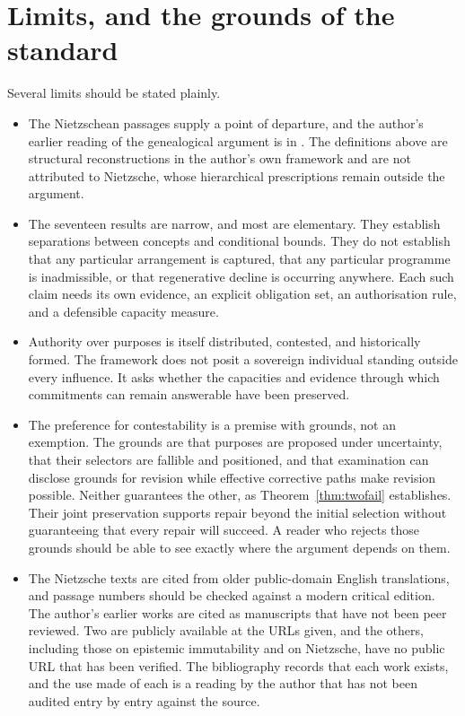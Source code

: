 \documentclass[11pt]{article}
\theoremstyle{definition}
\theoremstyle{remark}
\begin{document}
\section{Limits, and the grounds of the standard}

Several limits should be stated plainly.

\begin{itemize}[leftmargin=1.5em]
\item The Nietzschean passages supply a point of departure, and the author's earlier reading of the genealogical argument is in \cite{flyxionFBC}. The definitions above are structural reconstructions in the author's own framework and are not attributed to Nietzsche, whose hierarchical prescriptions remain outside the argument.
\item The seventeen results are narrow, and most are elementary. They establish separations between concepts and conditional bounds. They do not establish that any particular arrangement is captured, that any particular programme is inadmissible, or that regenerative decline is occurring anywhere. Each such claim needs its own evidence, an explicit obligation set, an authorisation rule, and a defensible capacity measure.
\item Authority over purposes is itself distributed, contested, and historically formed. The framework does not posit a sovereign individual standing outside every influence. It asks whether the capacities and evidence through which commitments can remain answerable have been preserved.
\item The preference for contestability is a premise with grounds, not an exemption. The grounds are that purposes are proposed under uncertainty, that their selectors are fallible and positioned, and that examination can disclose grounds for revision while effective corrective paths make revision possible. Neither guarantees the other, as Theorem~\ref{thm:twofail} establishes. Their joint preservation supports repair beyond the initial selection without guaranteeing that every repair will succeed. A reader who rejects those grounds should be able to see exactly where the argument depends on them.
\item The Nietzsche texts are cited from older public-domain English translations, and passage numbers should be checked against a modern critical edition. The author's earlier works are cited as manuscripts that have not been peer reviewed. Two are publicly available at the URLs given, and the others, including those on epistemic immutability and on Nietzsche, have no public URL that has been verified. The bibliography records that each work exists, and the use made of each is a reading by the author that has not been audited entry by entry against the source.
\end{itemize}
\end{document}
